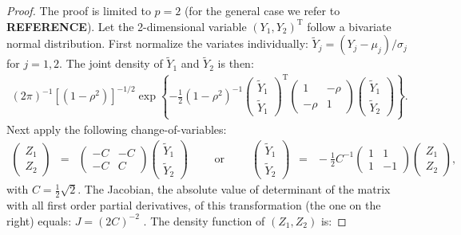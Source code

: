 \documentclass[a4paper]{article}
\theoremstyle{myexamplestyle}
\def\reminder#1{\marginpar{\rule[0pt]{1mm}{11pt}}\textbf{#1}}
\begin{document}
\begin{proof}
The proof is limited to $p=2$ (for the general case we refer to \reminder{REFERENCE}).
Let the 2-dimensional variable $(Y_1, Y_2)^{\mathrm{T}}$ follow a bivariate normal distribution. First normalize the variates individually: $\tilde{Y}_j  = (Y_j - \mu_j) / \sigma_j$ for $j=1, 2$. The joint density of $\tilde{Y}_1$ and $\tilde{Y}_2$ is then:
\begin{eqnarray*}
(2 \pi)^{-1} [(1-\rho^2)]^{-1/2}
\exp \left\{
- \frac{1}{2}
(1-\rho^2)^{-1}
\left(
\begin{array}{r}
\tilde{Y}_1
\\
\tilde{Y}_1
\end{array}
\right)^{\mathrm{T}}
\left(
\begin{array}{rr}
1 & -\rho
\\
-\rho & 1
\end{array}
\right)
\left(
\begin{array}{r}
\tilde{Y}_1
\\
\tilde{Y}_2
\end{array}
\right) \right\}.
\end{eqnarray*}
Next apply the following change-of-variables:
\begin{eqnarray*}
\left(
\begin{array}{c}
Z_1
\\
Z_2
\end{array}
\right)
& = &
\left(
\begin{array}{rr}
-C & -C
\\
-C & C
\end{array}
\right)
\left(
\begin{array}{c}
\tilde{Y}_1
\\
\tilde{Y}_2
\end{array}
\right) \qquad \mbox{ or } \qquad 
\left(
\begin{array}{c}
\tilde{Y}_1
\\
\tilde{Y}_2
\end{array}
\right)
\, \, \, = \, \, \, -\frac{1}{2} C^{-1}
\left(
\begin{array}{rr}
1 & 1
\\
1 & -1
\end{array}
\right)
\left(
\begin{array}{c}
Z_1
\\
Z_2
\end{array}
\right),
\end{eqnarray*}
with $C = \frac{1}{2} \sqrt{2}$. The Jacobian, the absolute value of determinant of the matrix with all first order partial derivatives, of this transformation (the one on the right) equals: $J = (2C)^{-2}$ . The density function of $(Z_1, Z_2)$ is:

\end{proof}
\end{document}
